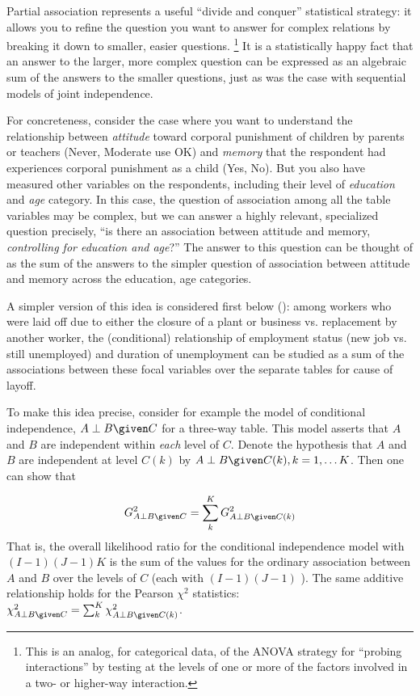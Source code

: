 \documentclass[11pt]{book}
\begin{document}
Partial association represents a useful ``divide and conquer'' statistical strategy:
it allows you to refine the question you want to answer for complex relations
by breaking it down to smaller, easier questions.%
\footnote{
This is an analog, for categorical data, of the ANOVA strategy for ``probing interactions''
by testing  at the levels of one or more of the
factors involved in a two- or higher-way interaction.
}
It is a statistically
happy fact that an answer to the larger, more complex question 
can be expressed as an algebraic sum of the answers to the smaller questions,
just as was the case with sequential models of joint independence. 

For concreteness, consider the case where you want to understand the
relationship between \emph{attitude} toward corporal punishment of children
by parents or teachers (Never, Moderate use OK) and \emph{memory}
that the respondent had experiences corporal punishment as a child (Yes, No).
But you also have measured other variables on the respondents, including their
level of \emph{education} and \emph{age} category.  In this case, the
question of association among all the table variables may be complex,
but we can answer a highly relevant, specialized question 
precisely, 
``is there an association between attitude and memory,
\emph{controlling for education and age}?''
The answer to this question can be thought of as the sum of the
answers to the simpler question of association between attitude and memory
across the education, age categories.

A simpler version of this idea is considered first below ():
among workers who were laid off
due to either the closure of a plant or business vs.
replacement by another worker,
the (conditional)
relationship of employment status (new job vs. still unemployed)
and duration of unemployment can be studied as a sum of the
associations between these focal variables over the separate tables
for cause of layoff.

To make this idea precise, consider for example the model of conditional independence, $A\perp B\given C$
for a three-way table. This model asserts that $A$ and $B$ are independent
within \textit{each} level of $C$. Denote the hypothesis that $A$ and $B$
are independent at level $C(k)$ by $A\perp B\given C(k), k=1, \dots K$. Then one can show
\citep{Andersen:91} that

\begin{equation}\label{eq:partial1}
G_{A\perp B\given C}^2=\sum_k^K G_{A\perp B\given C(k)}^2
\end{equation}
That is, the overall likelihood ratio \GSQ for the conditional independence model
with $(I-1)(J-1)K$ \df{} is the
sum of the values for the ordinary association between $A$ and $B$ over the levels of 
$C$ (each with $(I-1)(J-1)$ \df{}). The same additive relationship holds for the
Pearson $\chi^2$ statistics: $\chi^2_{A\perp B\given C}=\sum_k^K \chi^2_{A\perp B\given C(k)}$.
\end{document}
